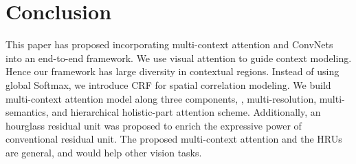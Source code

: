 \documentclass[10pt,twocolumn,letterpaper]{article}
\begin{document}
\vspace{-0.5em}
\section{Conclusion}
This paper has proposed incorporating multi-context attention and ConvNets into an end-to-end framework. 
We use visual attention to guide context modeling. 
Hence our framework has large diversity in contextual regions. 
Instead of using global Softmax, we introduce CRF for spatial correlation modeling. 
We build multi-context attention model along three components, 
\ie, multi-resolution, multi-semantics, and  hierarchical holistic-part attention scheme.
Additionally, an hourglass residual unit was proposed to enrich the expressive power of conventional residual unit. 
The proposed multi-context attention and the HRUs are general, and would help other vision tasks.
{\small


}
\end{document}
